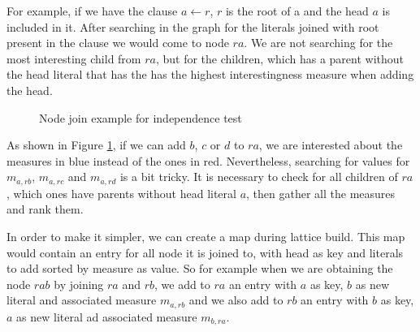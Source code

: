 For example, if we have the clause $a \leftarrow r$, $r$ is the root of a \graphname and the head $a$ is included in it.
After searching in the graph for the literals joined with root present in the clause we would come to node
$ra$. We are not searching for the most interesting child from $ra$, but for the children, which has a parent without
the head literal that has the has the highest interestingness measure when adding the head.

\begin{figure}[!h]
  \caption{Node join example for independence test}
  \centering
  \label{fig:latticeSuggestion}
\end{figure}

As shown in Figure \ref{fig:latticeSuggestion}, if we can add $b$, $c$ or $d$ to $ra$, we are interested about the
measures in blue instead of the ones in red. Nevertheless, searching for values for $m_{a,rb}$, $m_{a,rc}$ and
$m_{a,rd}$ is a bit tricky. It is necessary to check for all children of $ra$, which ones have parents without head
literal $a$, then gather all the measures and rank them.

In order to make it simpler, we can create a map during lattice build. This map would contain an entry for all node
it is joined to, with head as key and literals to add sorted by measure as value. So for example when we are obtaining
the node $rab$ by joining $ra$ and $rb$, we add to $ra$ an entry with $a$ as key, $b$ as new literal and
associated measure $m_{a,rb}$ and we also add to $rb$ an entry with $b$ as key, $a$ as new literal ad associated
measure $m_{b,ra}$. 

